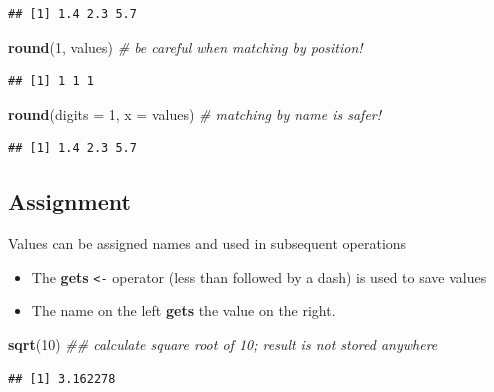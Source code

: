 \documentclass[
]{book}
\newenvironment{Shaded}{\begin{snugshade}}{\end{snugshade}}
\newcommand{\CommentTok}[1]{\textcolor[rgb]{0.56,0.35,0.01}{\textit{#1}}}
\newcommand{\DataTypeTok}[1]{\textcolor[rgb]{0.13,0.29,0.53}{#1}}
\newcommand{\DecValTok}[1]{\textcolor[rgb]{0.00,0.00,0.81}{#1}}
\newcommand{\KeywordTok}[1]{\textcolor[rgb]{0.13,0.29,0.53}{\textbf{#1}}}
\newcommand{\NormalTok}[1]{#1}
\providecommand{\tightlist}{%
  \setlength{\itemsep}{0pt}\setlength{\parskip}{0pt}}
\begin{document}
\begin{verbatim}
## [1] 1.4 2.3 5.7
\end{verbatim}

\begin{Shaded}
\begin{Highlighting}[]
\KeywordTok{round}\NormalTok{(}\DecValTok{1}\NormalTok{, values) }\CommentTok{# be careful when matching by position!}
\end{Highlighting}
\end{Shaded}

\begin{verbatim}
## [1] 1 1 1
\end{verbatim}

\begin{Shaded}
\begin{Highlighting}[]
\KeywordTok{round}\NormalTok{(}\DataTypeTok{digits =} \DecValTok{1}\NormalTok{, }\DataTypeTok{x =}\NormalTok{ values) }\CommentTok{# matching by name is safer!}
\end{Highlighting}
\end{Shaded}

\begin{verbatim}
## [1] 1.4 2.3 5.7
\end{verbatim}

\hypertarget{assignment}{%
\subsection{Assignment}\label{assignment}}

Values can be assigned names and used in subsequent operations

\begin{itemize}
\tightlist
\item
  The \textbf{gets} \texttt{\textless{}-} operator (less than followed by a dash) is used to save values
\item
  The name on the left \textbf{gets} the value on the right.
\end{itemize}

\begin{Shaded}
\begin{Highlighting}[]
\KeywordTok{sqrt}\NormalTok{(}\DecValTok{10}\NormalTok{) }\CommentTok{## calculate square root of 10; result is not stored anywhere}
\end{Highlighting}
\end{Shaded}

\begin{verbatim}
## [1] 3.162278
\end{verbatim}
\end{document}
